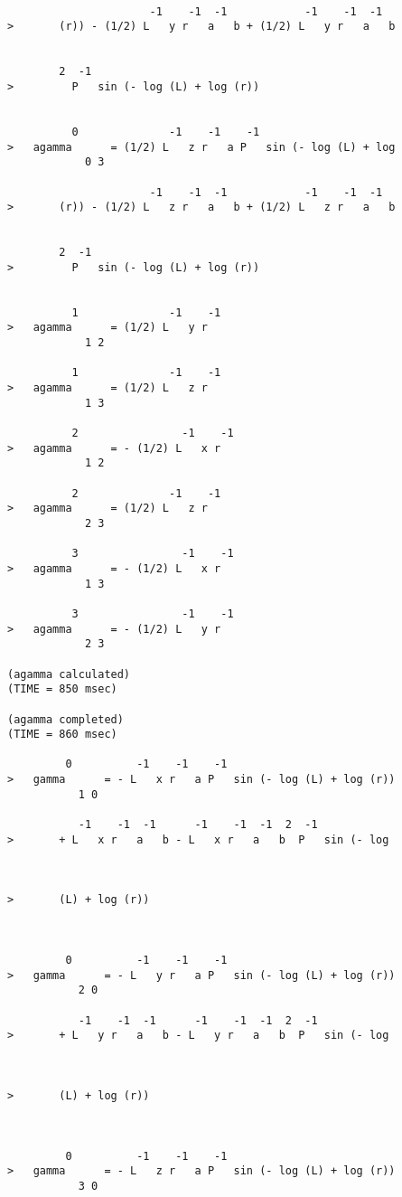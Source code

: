 \begin{verbatim}

                      -1    -1  -1            -1    -1  -1
>       (r)) - (1/2) L   y r   a   b + (1/2) L   y r   a   b


        2  -1
>         P   sin (- log (L) + log (r))


          0              -1    -1    -1
>   agamma      = (1/2) L   z r   a P   sin (- log (L) + log
            0 3

                      -1    -1  -1            -1    -1  -1
>       (r)) - (1/2) L   z r   a   b + (1/2) L   z r   a   b


        2  -1
>         P   sin (- log (L) + log (r))


          1              -1    -1
>   agamma      = (1/2) L   y r
            1 2

          1              -1    -1
>   agamma      = (1/2) L   z r
            1 3

          2                -1    -1
>   agamma      = - (1/2) L   x r
            1 2

          2              -1    -1
>   agamma      = (1/2) L   z r
            2 3

          3                -1    -1
>   agamma      = - (1/2) L   x r
            1 3

          3                -1    -1
>   agamma      = - (1/2) L   y r
            2 3

(agamma calculated)
(TIME = 850 msec)

(agamma completed)
(TIME = 860 msec)

         0          -1    -1    -1
>   gamma      = - L   x r   a P   sin (- log (L) + log (r))
           1 0

           -1    -1  -1      -1    -1  -1  2  -1
>       + L   x r   a   b - L   x r   a   b  P   sin (- log



>       (L) + log (r))



         0          -1    -1    -1
>   gamma      = - L   y r   a P   sin (- log (L) + log (r))
           2 0

           -1    -1  -1      -1    -1  -1  2  -1
>       + L   y r   a   b - L   y r   a   b  P   sin (- log



>       (L) + log (r))



         0          -1    -1    -1
>   gamma      = - L   z r   a P   sin (- log (L) + log (r))
           3 0


\end{verbatim}
